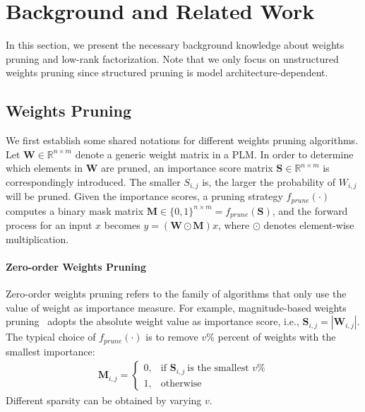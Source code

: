 \section{Background and Related Work}
In this section, we present the necessary background knowledge about weights pruning and low-rank factorization. Note that we only focus on unstructured weights pruning since structured pruning is model architecture-dependent.
\subsection{Weights Pruning}
\label{sec:pruning}
We first establish some shared notations for different weights pruning algorithms. 
Let $\bm{W}\in \mathbb{R}^{n\times m}$ denote a generic weight matrix in a PLM. In order to determine which elements in $\bm{W}$ are pruned, an importance score matrix $\bm{S}\in \mathbb{R}^{n\times m}$ is correspondingly introduced. The smaller $S_{i,j}$ is, the larger the probability of $W_{i,j}$ will be pruned. Given the importance scores, a pruning strategy $f_{prune}(\cdot)$ computes a binary mask matrix $\bm{M}\in \{0,1\}^{n\times m}=f_{prune}(\bm{S})$, 
and the forward process for an input $x$ becomes $y=(\bm{W}\odot\bm{M})x$, 
where $\odot$ denotes element-wise multiplication.

\paragraph{Zero-order Weights Pruning} Zero-order weights pruning refers to the family of algorithms that only use the value of weight as importance measure.
For example, magnitude-based weights pruning~\cite{mag,chen2020lottery} adopts the absolute weight value as importance score, i.e., 
$\bm{S}_{i, j}=|\bm{W}_{i, j}|$. The typical choice of $f_{prune}(\cdot)$ is to remove $v\%$ percent of weights with the smallest importance:
\begin{align}
	\bm{M}_{i,j}=
	\begin{cases} 
		0, & \text{if }\bm{S}_{i,j}~\text{is the smallest }v\%\\
		1,  & \text{otherwise}  
	\end{cases}
	\label{eq:zero}
\end{align}
Different sparsity can be obtained by varying $v$.

